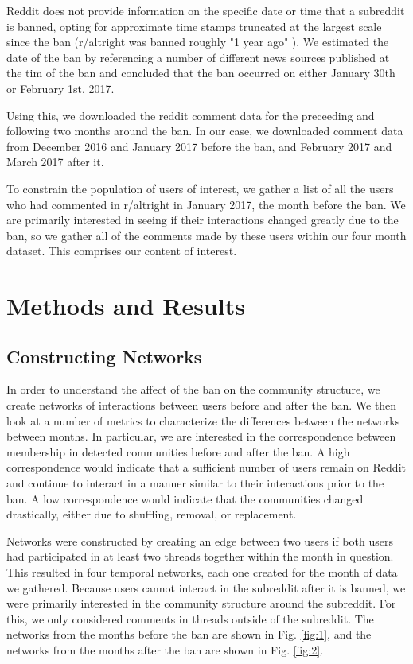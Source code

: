 \documentclass[twoside,twocolumn]{article}
\begin{document}
Reddit does not provide information on the specific date or time that a subreddit is banned, opting for approximate time stamps truncated at the largest scale since the ban (r/altright was banned roughly "1 year ago" \cite{raltright}). We estimated the date of the ban by referencing a number of different news sources published at the tim of the ban \cite{banaltright} and concluded that the ban occurred on either January 30th or February 1st, 2017. 

Using this, we downloaded the reddit comment data for the preceeding and following two months around the ban. In our case, we downloaded comment data from December 2016 and January 2017 before the ban, and February 2017 and March 2017 after it. 

To constrain the population of users of interest, we gather a list of all the users who had commented in r/altright in January 2017, the month before the ban. We are primarily interested in seeing if their interactions changed greatly due to the ban, so we gather all of the comments made by these users within our four month dataset. This comprises our content of interest. 


\section{Methods and Results}

\subsection{Constructing Networks}

In order to understand the affect of the ban on the community structure, we create networks of interactions between users before and after the ban. We then look at a number of metrics to characterize the differences between the networks between months. In particular, we are interested in the correspondence between membership in detected communities before and after the ban. A high correspondence would indicate that a sufficient number of users remain on Reddit and continue to interact in a manner similar to their interactions prior to the ban. A low correspondence would indicate that the communities changed drastically, either due to shuffling, removal, or replacement. 

Networks were constructed by creating an edge between two users if both users had participated in at least two threads together within the month in question. This resulted in four temporal networks, each one created for the month of data we gathered. Because users cannot interact in the subreddit after it is banned, we were primarily interested in the community structure around the subreddit. For this, we only considered comments in threads outside of the subreddit. The networks from the months before the ban are shown in Fig. \ref{fig:1}, and the networks from the months after the ban are shown in Fig. \ref{fig:2}.
\end{document}
